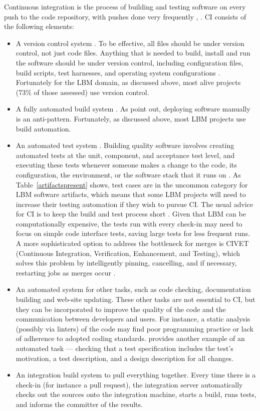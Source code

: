 \documentclass[final, 3p, times, authoryear]{elsarticle}
\begin{document}
Continuous integration is the process of building and testing software on every
push to the code repository, with pushes done very frequently \citep[p.\ 13]
{HumbleAndFarley2010}, \citep{ShahinEtAl2017, Fowler2006}.  CI consists of the
following elements:
\begin{itemize}
	\item A version control system \citep{Fowler2006}. To be effective, all
	files should be under version control, not just code files.  Anything that
	is needed to build, install and run the software should be under version
	control, including configuration files, build scripts, test harnesses, and
	operating system configurations \citep[p. 19]{HumbleAndFarley2010}.
	Fortunately for the LBM domain, as discussed above, most alive projects
	(73\% of those assessed) use version control.
	\item A fully automated build system \citep{Fowler2006}.  As \citet[p.\
	5]{HumbleAndFarley2010} point out, deploying software manually is an
	anti-pattern.  Fortunately, as discussed above, most LBM projects use build
	automation.
	\item An automated test system \citep{Fowler2006}. Building quality software
	involves creating automated tests at the unit, component, and acceptance
	test level, and executing these tests whenever someone makes a change to the
	code, its configuration, the environment, or the software stack that it runs
	on \citep[p.\ 83]{HumbleAndFarley2010}. As Table~\ref{artifactspresent}
	shows, test cases are in the uncommon category for LBM software artifacts,
	which means that some LBM projects will need to increase their testing
	automation if they wish to pursue CI.  The usual advice for CI is to keep
	the build and test process short \citep[p.\ 60]{HumbleAndFarley2010}. Given
	that LBM can be computationally expensive, the tests run with every check-in
	may need to focus on simple code interface tests, saving large tests for
	less frequent runs.  A more sophisticated option to address the bottleneck
	for merges is CIVET (Continuous Integration, Verification, Enhancement, and
	Testing), which solves this problem by intelligently pinning, cancelling,
	and if necessary, restarting jobs as merges occur \citep{SlaughterEtAl2021}.
	\item An automated system for other tasks, such as code checking,
	documentation building and web-site updating.  These other tasks are not
	essential to CI, but they can be incorporated to improve the quality
	of the code and the communication between developers and users. For
	instance, a static analysis (possibly via linters) of the code may find poor
	programming practice or lack of adherence to adopted coding standards.
	\citet{SlaughterEtAl2021} provides another example of an automated task ---
	checking that a test specification includes the test's motivation, a test
	description, and a design description for all changes. 
	\item An integration build system to pull everything together.  Every time
	there is a check-in (for instance a pull request), the integration server
	automatically checks out the sources onto the integration machine, starts a
	build, runs tests, and informs the committer of the results. 
\end{itemize}
\end{document}
